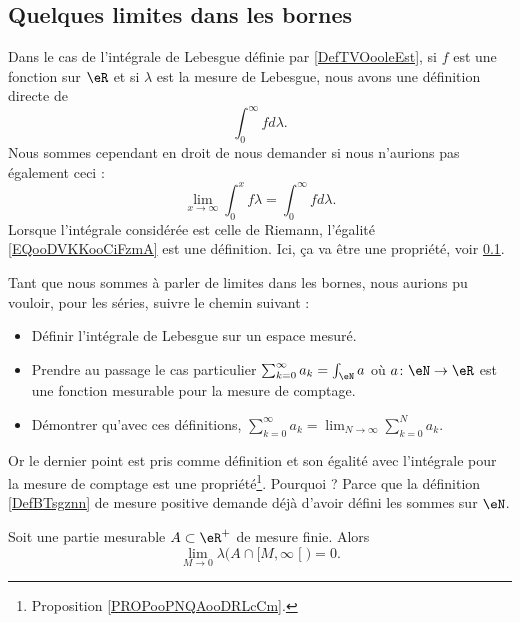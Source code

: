 \subsection{Quelques limites dans les bornes}

Dans le cas de l'intégrale de Lebesgue définie par \ref{DefTVOooleEst}, si \( f\) est une fonction sur \( \eR\) et si \( \lambda\) est la mesure de Lebesgue, nous avons une définition directe de
\begin{equation}
	\int_{0}^{\infty}fd\lambda.
\end{equation}
Nous sommes cependant en droit de nous demander si nous n'aurions pas également ceci :
\begin{equation}        \label{EQooDVKKooCiFzmA}
	\lim_{x\to \infty} \int_0^xf\lambda=\int_0^{\infty}fd\lambda.
\end{equation}
Lorsque l'intégrale considérée est celle de Riemann, l'égalité \eqref{EQooDVKKooCiFzmA} est une définition. Ici, ça va être une propriété, voir \ref{}.

\begin{normaltext}
	Tant que nous sommes à parler de limites dans les bornes, nous aurions pu vouloir, pour les séries, suivre le chemin suivant :
	\begin{itemize}
		\item Définir l'intégrale de Lebesgue sur un espace mesuré.
		\item Prendre au passage le cas particulier \( \sum_{k=0}^{\infty}a_k=\int_\eN a\) où \( a\colon \eN\to \eR\) est une fonction mesurable pour la mesure de comptage.
		\item Démontrer qu'avec ces définitions, \( \sum_{k=0}^{\infty}a_k=\lim_{N\to \infty} \sum_{k=0}^Na_k\).
	\end{itemize}
	Or le dernier point est pris comme définition et son égalité avec l'intégrale pour la mesure de comptage est une propriété\footnote{Proposition \ref{PROPooPNQAooDRLcCm}.}. Pourquoi ? Parce que la définition \ref{DefBTsgznn} de mesure positive demande déjà d'avoir défini les sommes sur \( \eN\).
\end{normaltext}

\begin{lemma}
	Soit une partie mesurable \( A\subset \eR^+\) de mesure finie. Alors
	\begin{equation}
		\lim_{M\to 0} \lambda\big( A\cap\mathopen[ M , \infty \mathclose[ \big)=0.
	\end{equation}
\end{lemma}

